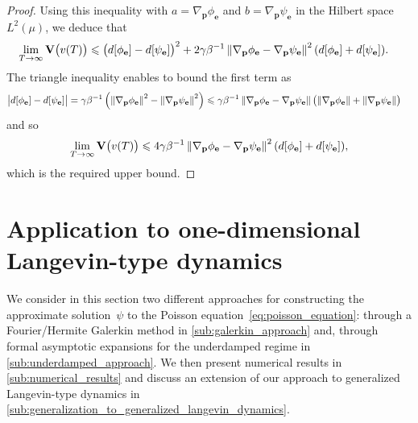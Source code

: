 \documentclass[11pt,a4paper]{article}
\newcommand{\var}[0]{\mathbf{V}}
\newcommand{\grad}{\nabla}
\newcommand{\vect}[1]{\boldsymbol{\mathbf #1}}
\theoremstyle{plain}
\numberwithin{equation}{section}
\renewcommand{\leq}{\leqslant}
\begin{document}
\begin{proof}
    Using this inequality with $a = \grad_{\vect p} \phi_{\vect e}$ and $b = \grad_{\vect p} \psi_{\vect e}$ in the Hilbert space $L^2(\mu)$,
    we deduce that
    \begin{align*}
        \lim_{T \to \infty} \var \bigl(v(T)\bigr)
        &\leq \bigl(d[\phi_{\vect e}] - d[\psi_{\vect e}]\bigr)^2 +
        2\gamma \beta^{-1} \norm{\grad_{\vect p} \phi_{\vect e} - \grad_{\vect p}  \psi_{\vect e}}^2 (d[\phi_{\vect e}] + d[\psi_{\vect e}]).
    \end{align*}
    The triangle inequality enables to bound the first term as
    \begin{align*}
        \bigl\lvert d[\phi_{\vect e}] - d[\psi_{\vect e}] \bigr\rvert
        &= \gamma \beta^{-1} \left( \norm{\grad_{\vect p} \phi_{\vect e}}^2 - \norm{\grad_{\vect p} \psi_{\vect e}}^2 \right)
        \leq \gamma \beta^{-1} \norm{\grad_{\vect p} \phi_{\vect e} - \grad_{\vect p} \psi_{\vect e}} \bigl( \norm{\grad_{\vect p} \phi_{\vect e}} + \norm{\grad_{\vect p} \psi_{\vect e}} \bigr)
    \end{align*}
    and so
    \[
        \lim_{T \to \infty} \var \bigl(v(T)\bigr)
        \leq  4\gamma \beta^{-1}  \norm{\grad_{\vect p} \phi_{\vect e} - \grad_{\vect p}  \psi_{\vect e}}^2 (d[\phi_{\vect e}] + d[\psi_{\vect e}]),
    \]
    which is the required upper bound.
\end{proof}

%

\section{Application to one-dimensional Langevin-type dynamics}%
\label{sec:application_to_one_dimensional_langevin_type_dynamics}

We consider in this section two different approaches for constructing the approximate solution~$\psi$ to the Poisson equation~\eqref{eq:poisson_equation}:
through a Fourier/Hermite Galerkin method in \cref{sub:galerkin_approach} and,
through formal asymptotic expansions for the underdamped regime in \cref{sub:underdamped_approach}.
We then present numerical results in \cref{sub:numerical_results}
and discuss an extension of our approach to generalized Langevin-type dynamics in \cref{sub:generalization_to_generalized_langevin_dynamics}.
\end{document}
